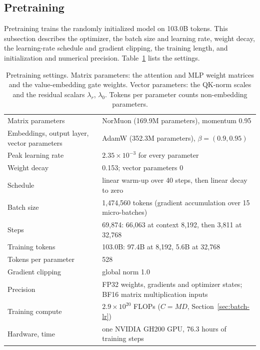 \documentclass[sigconf,nonacm,balance=false]{acmart}
\providecommand{\arraybackslash}{\let\\\tabularnewline}
\begin{document}
\subsection{Pretraining}
\label{sec:pretraining}

Pretraining trains the randomly initialized model on 103.0B tokens. This subsection describes the optimizer, the batch
size and learning rate, weight decay, the learning-rate schedule and gradient clipping, the training length, and
initialization and numerical precision. Table~\ref{tab:train} lists the settings.

\begin{table}
  \caption{Pretraining settings. Matrix parameters: the attention and MLP weight matrices and the value-embedding gate
  weights. Vector parameters: the QK-norm scales and the residual scalars $\lambda_r$, $\lambda_0$. Tokens per
  parameter counts non-embedding parameters.}
  \label{tab:train}
  \small
  \setlength{\tabcolsep}{4pt}
  \begin{tabular}{>{\raggedright\arraybackslash}p{2.8cm}>{\raggedright\arraybackslash}p{5.0cm}}
    \toprule
    Matrix parameters & NorMuon (169.9M parameters), momentum 0.95 \\
    Embeddings, output layer, vector parameters & AdamW (352.3M parameters), $\beta = (0.9, 0.95)$ \\
    Peak learning rate & $2.35 \times 10^{-3}$ for every parameter \\
    Weight decay & 0.153; vector parameters 0 \\
    Schedule & linear warm-up over 40 steps, then linear decay to zero \\
    Batch size & 1,474,560 tokens (gradient accumulation over 15 micro-batches) \\
    Steps & 69,874: 66,063 at context 8,192, then 3,811 at 32,768 \\
    Training tokens & 103.0B: 97.4B at 8,192, 5.6B at 32,768 \\
    Tokens per parameter & 528 \\
    Gradient clipping & global norm 1.0 \\
    Precision & FP32 weights, gradients and optimizer states; BF16 matrix multiplication inputs \\
    Training compute & $2.9 \times 10^{20}$ FLOPs ($C = MD$, Section~\ref{sec:batch-lr}) \\
    Hardware, time & one NVIDIA GH200 GPU, 76.3 hours of training steps \\
    \bottomrule
  \end{tabular}
\end{table}
\end{document}
